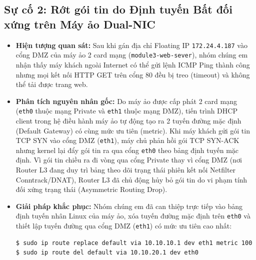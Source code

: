 \subsection{Sự cố 2: Rớt gói tin do Định tuyến Bất đối xứng trên Máy ảo Dual-NIC}
\begin{itemize}
    \item \textbf{Hiện tượng quan sát:} Sau khi gán địa chỉ Floating IP \texttt{172.24.4.187} vào cổng DMZ của máy ảo 2 card mạng (\texttt{module3-web-sever}), nhóm chúng em nhận thấy máy khách ngoài Internet có thể gửi lệnh ICMP Ping thành công nhưng mọi kết nối HTTP GET trên cổng 80 đều bị treo (timeout) và không thể tải được trang web.
    \item \textbf{Phân tích nguyên nhân gốc:} Do máy ảo được cấp phát 2 card mạng (\texttt{eth0} thuộc mạng Private và \texttt{eth1} thuộc mạng DMZ), tiến trình DHCP client trong hệ điều hành máy ảo tự động tạo ra 2 tuyến đường mặc định (Default Gateway) có cùng mức ưu tiên (metric). Khi máy khách gửi gói tin TCP SYN vào cổng DMZ (\texttt{eth1}), máy chủ phản hồi gói TCP SYN-ACK nhưng kernel lại đẩy gói tin ra qua cổng \texttt{eth0} theo bảng định tuyến mặc định. Vì gói tin chiều ra đi vòng qua cổng Private thay vì cổng DMZ (nơi Router L3 đang duy trì bảng theo dõi trạng thái phiên kết nối Netfilter Conntrack/DNAT), Router L3 đã chủ động hủy bỏ gói tin do vi phạm tính đối xứng trạng thái (Asymmetric Routing Drop).
    \item \textbf{Giải pháp khắc phục:} Nhóm chúng em đã can thiệp trực tiếp vào bảng định tuyến nhân Linux của máy ảo, xóa tuyến đường mặc định trên \texttt{eth0} và thiết lập tuyến đường qua cổng DMZ (\texttt{eth1}) có mức ưu tiên cao nhất:
\begin{lstlisting}[language=bash]
$ sudo ip route replace default via 10.10.10.1 dev eth1 metric 100
$ sudo ip route del default via 10.10.20.1 dev eth0
\end{lstlisting}
\end{itemize}

